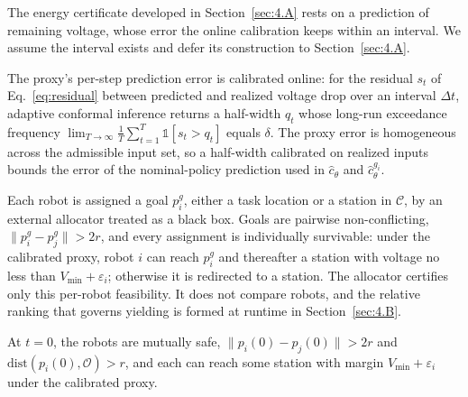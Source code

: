 The energy certificate developed in Section~\ref{sec:4.A} rests on a prediction of remaining voltage, whose error the online calibration keeps within an interval.
We assume the interval exists and defer its construction to Section~\ref{sec:4.A}.

\begin{assumption} \label{as:proxy}
The proxy's per-step prediction error is calibrated online: for the residual $s_t$ of Eq.~\eqref{eq:residual} between predicted and realized voltage drop over an interval $\Delta t$, adaptive conformal inference returns a half-width $q_t$ whose long-run exceedance frequency $\lim_{T\to\infty} \frac{1}{T} \sum_{t=1}^{T} \mathbb{1}[s_t > q_t]$ equals $\delta$. 
The proxy error is homogeneous across the admissible input set, so a half-width calibrated on realized inputs bounds the error of the nominal-policy prediction used in $\hat{c}_\theta$ and $\hat c_\theta^{g_i}$.
\end{assumption}

\begin{assumption} \label{as:allocator}
Each robot is assigned a goal $p_i^g$, either a task location or a station in $\mathcal{C}$, by an external allocator treated as a black box. 
Goals are pairwise non-conflicting, $\|p_i^g - p_j^g\| > 2r$, and every assignment is individually survivable: under the calibrated proxy, robot $i$ can reach $p_i^g$ and thereafter a station with voltage no less than $V_{\min} + \varepsilon_i$; otherwise it is redirected to a station. 
The allocator certifies only this per-robot feasibility. 
It does not compare robots, and the relative ranking that governs yielding is formed at runtime in Section~\ref{sec:4.B}.
\end{assumption}

\begin{assumption}\label{as:init}
At $t=0$, the robots are mutually safe, $\|p_i(0) - p_j(0)\| > 2r$ and $\mathrm{dist}(p_i(0), \mathcal{O}) > r$, and each can reach some station with margin $V_{\min} + \varepsilon_i$ under the calibrated proxy.
\end{assumption}

